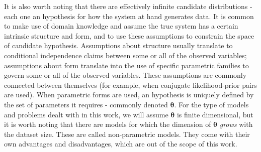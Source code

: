 It is also worth noting that there are effectively infinite candidate distributions -
each one an hypothesis for how the system at hand generates data. It is common
to make use of domain knowledge and assume the true system has a certain intrinsic
structure and form, and to use these assumptions to constrain the space of
candidate hypothesis. Assumptions about structure usually translate to conditional
independence claims between some or all of the observed variables; assumptions
about form translate into the use of specific parametric families to govern some
or all of the observed variables. These assumptions are commonly connected between
themselves (for example, when conjugate likelihood-prior pairs are used). When parametric
forms are used, an hypothesis is uniquely defined by the set of parameters it
requires - commonly denoted $\bm{\theta}$. For the type of models and problems
dealt with in this work, we will assume $\bm{\theta}$ is finite dimensional, but it is worth
noting that there are models for which the dimension of $\bm{\theta}$ \emph{grows}
with the dataset size. These are called non-parametric models. They come with
their own advantages and disadvantages, which are out of the scope of this work.

